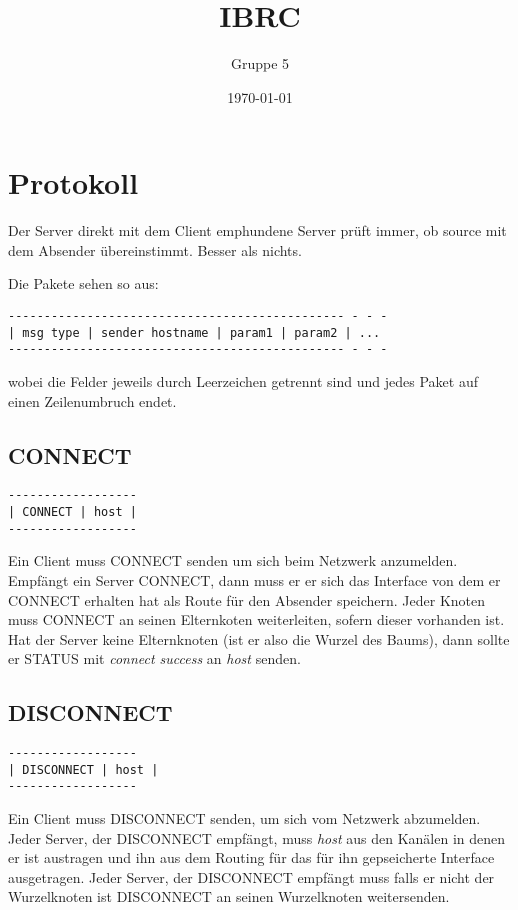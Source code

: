 \documentclass{article}
\title{IBRC}
\author{Gruppe 5}
\date{\today}
\begin{document}
\maketitle

\section{Protokoll}

Der Server direkt mit dem Client emphundene Server prüft immer, ob source mit dem Absender übereinstimmt. Besser als nichts. 

Die Pakete sehen so aus:

\begin{lstlisting}
----------------------------------------------- - - -
| msg type | sender hostname | param1 | param2 | ...
----------------------------------------------- - - -
\end{lstlisting}

wobei die Felder jeweils durch Leerzeichen getrennt sind und jedes Paket auf einen Zeilenumbruch endet.

\subsection{CONNECT}

\begin{lstlisting}
------------------
| CONNECT | host |
------------------
\end{lstlisting}

Ein Client muss CONNECT senden um sich beim Netzwerk anzumelden. Empfängt ein Server CONNECT, dann muss er er sich das Interface von dem er CONNECT erhalten hat als Route für den Absender speichern.
Jeder Knoten muss CONNECT an seinen Elternkoten weiterleiten, sofern dieser vorhanden ist.
Hat der Server keine Elternknoten (ist er also die Wurzel des Baums), dann sollte er STATUS mit \emph{connect success} an \emph{host} senden.

\subsection{DISCONNECT}

\begin{lstlisting}
------------------
| DISCONNECT | host |
------------------
\end{lstlisting}

Ein Client muss DISCONNECT senden, um sich vom Netzwerk abzumelden.
Jeder Server, der DISCONNECT empfängt, muss \emph{host} aus den Kanälen in denen er ist austragen und ihn aus dem Routing für das für ihn gepseicherte Interface ausgetragen.
Jeder Server, der DISCONNECT empfängt muss falls er nicht der Wurzelknoten ist DISCONNECT an seinen Wurzelknoten weitersenden.
\end{document}
